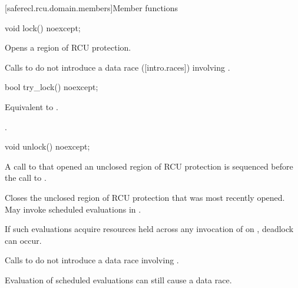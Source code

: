[saferecl.rcu.domain.members]{Member functions}

\begin{itemdecl}
void lock() noexcept;
\end{itemdecl}

\begin{itemdescr}

\pnum
\effects
Opens a region of RCU protection.

\pnum
\remarks
Calls to  do not introduce a data race
([intro.races]) involving .

\end{itemdescr}

\begin{itemdecl}
bool try_lock() noexcept;
\end{itemdecl}

\begin{itemdescr}

\pnum
\effects
Equivalent to .

\pnum
\returns
{}.

\end{itemdescr}


\begin{itemdecl}
void unlock() noexcept;
\end{itemdecl}

\begin{itemdescr}

\pnum
\expects
A call to  that opened
an unclosed region of RCU protection is sequenced before the
call to .

\pnum
\effects
Closes the unclosed region of RCU protection that was
most recently opened.
May invoke scheduled evaluations in .

\pnum
\begin{note}
If such evaluations acquire resources held across any invocation
of  on , deadlock can occur.
\end{note}
Calls to  do not introduce a data race
involving .
\begin{note}
Evaluation of scheduled evaluations can still cause a data race.
\end{note}

\end{itemdescr}

